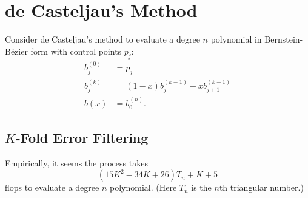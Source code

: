 \documentclass[letterpaper,10pt]{article}
\begin{document}
\tableofcontents

\section{de Casteljau's Method}

Consider de Casteljau's method to evaluate a degree \(n\)
polynomial in Bernstein-B\'{e}zier form with control points \(p_j\):
\begin{align*}
    b_j^{(0)} &= p_j \\
    b_j^{(k)} &= (1 - x) b_j^{(k - 1)} + x b_{j + 1}^{(k - 1)} \\
    b(x) &= b_0^{(n)}.
\end{align*}

\subsection{\(K\)-Fold Error Filtering}

Empirically, it seems the process takes
\[(15K^2 - 34K + 26)T_n + K + 5\]
flops to evaluate a degree \(n\) polynomial. (Here \(T_n\) is the
\(n\)th triangular number.)
\end{document}

